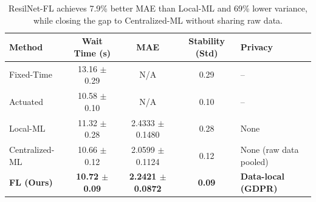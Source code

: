 
\begin{table}[htbp]
\centering
\caption{Performance Comparison of Traffic Signal Control Methods (mean $\pm$ std, 5 trials)}
\label{tab:results}
\begin{tabular}{lcccl}
\toprule
\textbf{Method} & \textbf{Wait Time (s)} & \textbf{MAE} & \textbf{Stability (Std)} & \textbf{Privacy} \\
\midrule
Fixed-Time      & 13.16 $\pm$ 0.29 & N/A & 0.29 & -- \\
Actuated        & 10.58 $\pm$ 0.10 & N/A & 0.10 & -- \\
Local-ML        & 11.32 $\pm$ 0.28 & 2.4333 $\pm$ 0.1480 & 0.28 & None \\
Centralized-ML  & 10.66 $\pm$ 0.12 & 2.0599 $\pm$ 0.1124 & 0.12 & None (raw data pooled) \\
\textbf{FL (Ours)} & \textbf{10.72 $\pm$ 0.09} & \textbf{2.2421 $\pm$ 0.0872} & \textbf{0.09} & \textbf{Data-local (GDPR)} \\
\bottomrule
\end{tabular}
\vspace{2mm}
\caption*{ResilNet-FL achieves 7.9\% better MAE than Local-ML and 69\% lower variance, while closing the gap to Centralized-ML without sharing raw data.}
\end{table}
